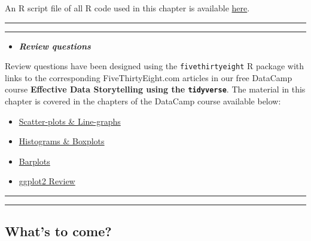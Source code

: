 \documentclass[]{tufte-book}
\let\oldrule=\rule
\renewcommand{\rule}[1]{\oldrule{\linewidth}}
\newenvironment{rmdblock}[1]
  {\begin{shaded*}
  \begin{itemize}
  \renewcommand{\labelitemi}{
    \raisebox{-.7\height}[0pt][0pt]{
    }
  }
  \item
  }
  {
  \end{itemize}
  \end{shaded*}
  }
\newenvironment{review}
  {\begin{rmdblock}{warning}}
  {\end{rmdblock}}
\begin{document}
An R script file of all R code used in this chapter is available
\href{http://ismayc.github.io/moderndiver-book/scripts/04-viz.R}{here}.

\begin{center}\rule{0.5\linewidth}{\linethickness}\end{center}

\begin{center}\rule{0.5\linewidth}{\linethickness}\end{center}

\begin{review}
\textbf{\emph{Review questions}}
\end{review}

Review questions have been designed using the \texttt{fivethirtyeight} R
package \citep{R-fivethirtyeight} with links to the corresponding
FiveThirtyEight.com articles in our free DataCamp course
\textbf{Effective Data Storytelling using the \texttt{tidyverse}}. The
material in this chapter is covered in the chapters of the DataCamp
course available below:

\begin{itemize}
\item
  \href{https://campus.datacamp.com/courses/effective-data-storytelling-using-the-tidyverse/scatter-plots-line-graphs}{Scatter-plots
  \& Line-graphs}
\item
  \href{https://campus.datacamp.com/courses/effective-data-storytelling-using-the-tidyverse/histograms-boxplots}{Histograms
  \& Boxplots}
\item
  \href{https://campus.datacamp.com/courses/effective-data-storytelling-using-the-tidyverse/barplots}{Barplots}
\item
  \href{https://campus.datacamp.com/courses/effective-data-storytelling-using-the-tidyverse/ggplot2-review}{ggplot2
  Review}
\end{itemize}

\begin{center}\rule{0.5\linewidth}{\linethickness}\end{center}

\begin{center}\rule{0.5\linewidth}{\linethickness}\end{center}

\subsection{What's to come?}\label{whats-to-come-1}
\end{document}

